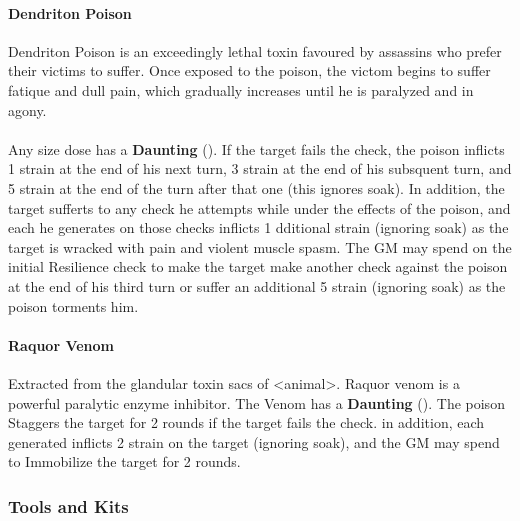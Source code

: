 \begin{multicols}{2}
\paragraph{Dendriton Poison} \label{poison:dendriton}
Dendriton Poison is an exceedingly lethal toxin favoured by assassins who
prefer their victims to suffer. Once exposed to the poison, the victom begins
to suffer fatique and dull pain, which gradually increases until he is
paralyzed and in agony.\\
\\
Any size dose has a \textbf{Daunting} (\difficulty\difficulty\difficulty\difficulty).
If the target fails the check, the poison inflicts 1 strain at the end of his
next turn, 3 strain at the end of his subsquent turn, and 5 strain at the end
of the turn after that one (this ignores soak). In addition, the target sufferts
\setback to any check he attempts while under the effects of the poison, and
each \threat he generates on those checks inflicts 1 dditional strain (ignoring
soak) as the target is wracked with pain and violent muscle spasm. The GM may
spend \despair on the initial Resilience check to make the target make another
check against the poison at the end of his third turn or suffer an additional
5 strain (ignoring soak) as the poison torments him.

\paragraph{Raquor Venom} \label{poison:raquor}
Extracted from the glandular toxin sacs of <animal>. Raquor venom is a powerful
paralytic enzyme inhibitor. The Venom has a \textbf{Daunting} (\difficulty\difficulty\difficulty\difficulty).
The poison Staggers the target for 2 rounds if the target fails the check. in
addition, each \threat generated inflicts 2 strain on the target (ignoring soak),
and the GM may spend \despair to Immobilize the target for 2 rounds.

\end{multicols}
\hrulefill

\subsubsection{Tools and Kits}

